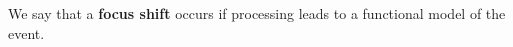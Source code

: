 \begin{defn}\label{def:interest}
  \hypertarget{def:interest}{} We say that a \textbf{focus shift} occurs
  if processing leads to a functional model of the event.
\end{defn}


                                         
